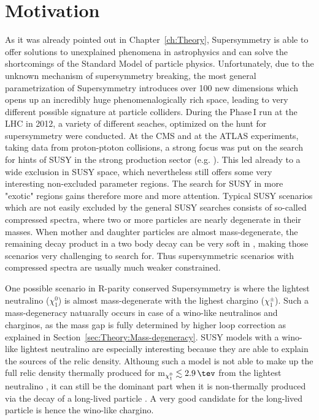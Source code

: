 \section{Motivation}
\label{sec:Motivation}
As it was already pointed out in Chapter~\ref{ch:Theory}, Supersymmetry is able to offer solutions to unexplained phenomena in astrophysics and can solve the shortcomings of the Standard Model of particle physics.
Unfortunately, due to the unknown mechanism of supersymmetry breaking, the most general parametrization of Supersymmetry introduces over 100 new dimensions which opens up an incredibly huge phenomenalogically rich space, 
leading to very different possible signature at particle colliders. 
During the Phase\,I run at the LHC in 2012, a variety of different seaches, optimized on the hunt for supersymmetry were conducted.
At the CMS and at the ATLAS experiments, taking data from proton-ptoton collisions, a strong focus was put on the search for hints of SUSY in the strong production sector (e.g. \cite{bib:CMS:RA2_8TeV,bib:CMS:MT2_8TeV,bib:ATLAS:JetPlusMET_8TeV}).
This led already to a wide exclusion in SUSY space, which nevertheless still offers some very interesting non-excluded parameter regions.
The search for SUSY in more "exotic" regions gains therefore more and more attention. 
Typical SUSY scenarios which are not easily excluded by the general SUSY searches consists of so-called compressed spectra, where two or more particles are nearly degenerate in their masses.
When mother and daughter particles are almost mass-degenerate, the remaining decay product in a two body decay can be very soft in \pt, making those scenarios very challenging to search for.
Thus supersymmetric scenarios with compressed spectra are usually much weaker constrained.

One possible scenario in R-parity conserved Supersymmetry is where the lightest neutralino ($\chi^{0}_1$) is almost mass-degenerate with the lighest chargino ($\chi^{\pm}_1$).
Such a mass-degeneracy natuarally occurs in case of a wino-like neutralinos and charginos, as the mass gap is fully determined by higher loop correction as explained in Section~\ref{sec:Theory:Mass-degeneracy}.
SUSY models with a wino-like lightest neutralino are especially interesting because they are able to explain the sources of the relic density.
Althoung such a model is not able to make up the full relic density thermally produced for m$_{\chi^{0}_1}\lesssim 2.9\,\tev$ from the lightest neutralino \cite{bib:Ibe:DarkMatter_2015}, 
it can still be the dominant part when it is non-thermally produced via the decay of a long-lived particle \cite{bib:Moroi:DarkMatter_2013}.
A very good candidate for the long-lived particle is hence the wino-like chargino.


